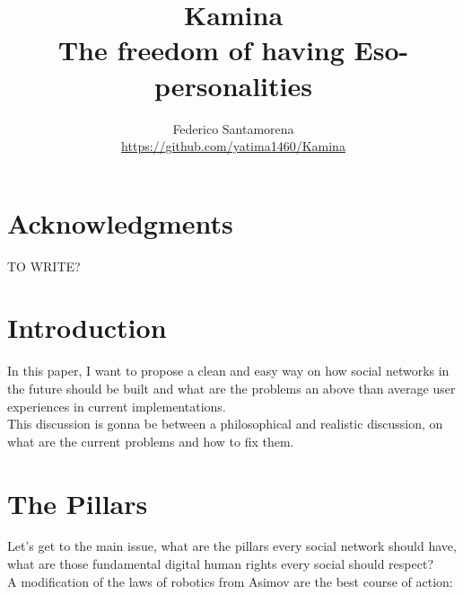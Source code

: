 \documentclass[12pt]{article}
\begin{document}
\title
{
    Kamina \\
    The freedom of having Eso-personalities \\
}
\author
{
    Federico Santamorena \\
    \href{https://github.com/yatima1460/Kamina}{https://github.com/yatima1460/Kamina} \\ 
}
\maketitle



\section{Acknowledgments}
TO WRITE?

\section{Introduction}

In this paper, I want to propose a clean and easy way on how social networks in the future should be built and what are the problems an above than average user experiences in current implementations. \\
This discussion is gonna be between a philosophical and realistic discussion, on what are the current problems and how to fix them.


\newpage

\section{The Pillars}

Let's get to the main issue, what are the pillars every social network should have, what are those fundamental digital human rights every social should respect? \\
A modification of the laws of robotics from Asimov are the best course of action:
\end{document}
